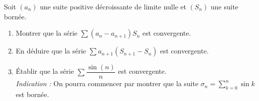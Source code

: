Soit $(a_n )$ une suite positive décroissante de limite nulle et $(S_n )$ une
suite bornée.
\begin{enumerate}
  \item Montrer que la série $\displaystyle\sum {(a_n  - a_{n + 1} )S_n } $ est convergente.
  \item En déduire que la série $\displaystyle\sum {a_{n+1} (S_{n+1}  - S_{n} )} $ est convergente.
  \item Établir que la série $\displaystyle\sum {\dfrac{{\sin (n)}}{n}} $ est convergente.\\
  \emph{Indication :} On pourra commencer par montrer que la suite $\sigma_n=\displaystyle\sum_{k=0}^n\sin k$ est bornée.
\end{enumerate}
